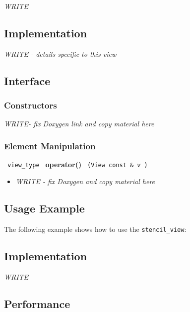 \textit{WRITE}

\subsection{Implementation}

\textit{WRITE - details specific to this view}

\subsection{Interface} \label{sec-sten-vw-inter}

\subsubsection{Constructors}

\textit{WRITE-  fix Doxygen link and copy material here}

\subsubsection{ Element Manipulation}

\noindent
\texttt{%
view\_type
}
\newline
\textbf{operator()}%
\texttt{%
(View const \&
\textit{v}%
)
}

\begin{itemize}
\item
\textit{WRITE -  fix Doxygen and copy material here }
\end{itemize}

\subsection{Usage Example} \label{sec-sten-vw-use}

The following example shows how to use the \texttt{stencil\_view}:


\subsection{Implementation} \label{sec-sten-vw-impl}

\textit{WRITE}

\subsection{Performance} \label{sec-sten-vw-perf}

